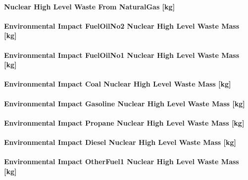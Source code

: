 \paragraph{Nuclear High Level Waste From NaturalGas {[}kg{]}}\label{nuclear-high-level-waste-from-natural-gas-kg}

\paragraph{Environmental Impact FuelOilNo2 Nuclear High Level Waste Mass {[}kg{]}}\label{environmental-impact-fuel-oil-2-nuclear-high-level-waste-mass-kg}

\paragraph{Environmental Impact FuelOilNo1 Nuclear High Level Waste Mass {[}kg{]}}\label{environmental-impact-fuel-oil-1-nuclear-high-level-waste-mass-kg}

\paragraph{Environmental Impact Coal Nuclear High Level Waste Mass {[}kg{]}}\label{environmental-impact-coal-nuclear-high-level-waste-mass-kg}

\paragraph{Environmental Impact Gasoline Nuclear High Level Waste Mass {[}kg{]}}\label{environmental-impact-gasoline-nuclear-high-level-waste-mass-kg}

\paragraph{Environmental Impact Propane Nuclear High Level Waste Mass {[}kg{]}}\label{environmental-impact-propane-nuclear-high-level-waste-mass-kg}

\paragraph{Environmental Impact Diesel Nuclear High Level Waste Mass {[}kg{]}}\label{environmental-impact-diesel-nuclear-high-level-waste-mass-kg}

\paragraph{Environmental Impact OtherFuel1 Nuclear High Level Waste Mass {[}kg{]}}\label{environmental-impact-otherfuel1-nuclear-high-level-waste-mass-kg}

